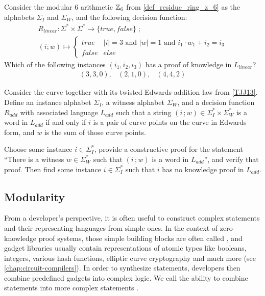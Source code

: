 \begin{exercise} Consider the modular $6$ arithmetic $\mathbb{Z}_6$ from \examplename{} \ref{def_residue_ring_z_6} as the alphabets $\Sigma_I$ and $\Sigma_W$, and the following decision function:
\begin{multline*}
R_{linear} : \Sigma^* \times \Sigma^* \to \{true, false\}\;;\;\\
(i;w) \mapsto
\begin{cases}
true & |i|=3 \text{ and } |w|=1 \text{ and } i_1\cdot w_1 + i_2 = i_3\\
false & else
\end{cases}
\end{multline*}
Which of the following instances $(i_1,i_2,i_3)$ has a proof of knowledge in $L_{linear}$?
$$ 
\begin{array}{ccc}
(3,3,0) , & (2,1,0), & (4,4,2)
\end{array}
$$
\end{exercise}
\begin{exercise}
\label{ex:TJJ-addition-lang} Consider the  curve together with its twisted Edwards addition law from \examplename{} \ref{TJJ13}. Define an instance alphabet $\Sigma_I$, a witness alphabet $\Sigma_W$, and a decision function $R_{add}$ with associated language $L_{add}$ such that a string $(i\,;w)\in \Sigma_I^* \times \Sigma_W^*$ is a word in $L_{add}$ if and only if $i$ is a pair of curve points on the  curve in Edwards form, and $w$ is the sum of those curve points.

Choose some instance $i\in \Sigma_I^*$, provide a constructive proof for the statement ``There is a witness $w\in \Sigma_W^*$ such that $(i\,;w)$ is a word in $L_{add}$'', and verify that proof. Then find some instance $i\in \Sigma_I^*$ such that $i$ has no knowledge proof in $L_{add}$.
\end{exercise}

\subsection{Modularity}\label{modularity} 
From a developer's perspective, it is often useful to construct complex statements and their representing languages from simple ones. In the context of zero-knowledge proof systems, those simple building blocks are often called , and gadget libraries usually contain representations of atomic types like booleans, integers, various hash functions, elliptic curve cryptography and much more (see \chaptname{} \ref{chap:circuit-compilers}). In order to synthesize statements, developers then combine predefined gadgets into complex logic. We call the ability to combine statements into more complex statements . 

